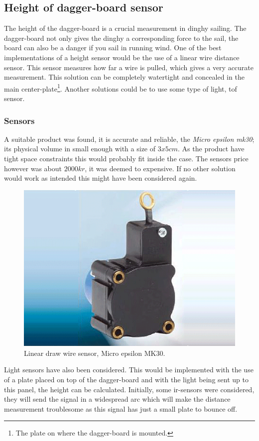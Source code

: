 \subsection{Height of dagger-board sensor}
The height of the dagger-board is a crucial measurement in dinghy sailing. The dagger-board not only gives the dinghy a corresponding force to the sail, the board can also be a danger if you sail in running wind. One of the best implementations of a height sensor would be the use of a linear wire distance sensor. This sensor measures how far a wire is pulled, which gives a very accurate measurement. This solution can be completely watertight and concealed in the main center-plate\footnote{The plate on where the dagger-board is mounted.}. Another solutions could be to use some type of light, \gls{tof} sensor. 

\subsubsection{Sensors}
A suitable product was found, it is accurate and reliable, the \emph{Micro epsilon mk30}; its physical volume in small enough with a size of $3x5cm$. As the product have tight space constraints this would probably fit inside the case. The sensors price however was about $2000kr$, it was deemed to expensive. If no other solution would work as intended this might have been considered again.
\begin{figure}[H]
\begin{center}
	\includegraphics[width = .45\textwidth]{Figures/microepsilon_mk30.png}
	\caption{Linear draw wire sensor, Micro epsilon MK30.}
	\label{Draw_sensor}
\end{center}
\end{figure}

Light sensors have also been considered. This would be implemented with the use of a plate placed on top of the dagger-board and with the light being sent up to this panel, the height can be calculated. Initially, some \gls{ir}-sensors were considered,  they will send the signal in a widespread arc which will make the distance measurement troublesome as this signal has just a small plate to bounce off.

